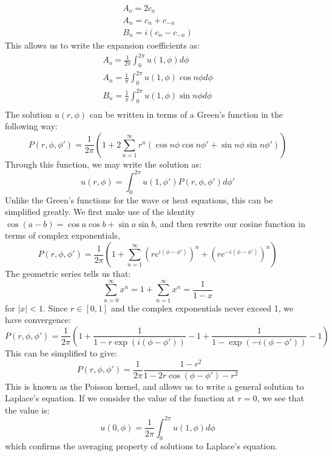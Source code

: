 \documentclass{article}
\begin{document}
\begin{appendices}
\begin{equation}
  \begin{matrix}
    A_o = 2 c_o\\
    A_n = c_n + c_{-n}\\
    B_n = i(c_n - c_{-n})
  \end{matrix}
\end{equation}
This allows us to write the expansion coefficients as:
\begin{equation}
  \begin{matrix}
    A_o = \frac{1}{2\pi}\int_0^{2\pi} u(1,\phi)d\phi\\
    A_n = \frac{1}{\pi}\int_0^{2\pi} u(1,\phi)\cos n\phi d\phi\\
    B_n = \frac{1}{\pi}\int_0^{2\pi} u(1,\phi)\sin n\phi d\phi\\
  \end{matrix}
\end{equation}
The solution $u(r,\phi)$ can be written in terms of a Green's function in the following way:
\begin{equation}P(r,\phi,\phi') = \frac{1}{2\pi}\left(1+ 2\sum_{n=1}^\infty r^n (\cos n\phi\cos n\phi'+\sin n\phi\sin n\phi') \right)
\end{equation}
Through this function, we may write the solution as:
\begin{equation}
  u(r,\phi) = \int_0^{2\pi} u(1,\phi')P(r,\phi,\phi')d\phi'
\end{equation}
Unlike the Green's functions for the wave or heat equations, this can be simplified greatly. We first make use of the identity $\cos(a-b)=\cos a\cos b+\sin a\sin b$, and then rewrite our cosine function in terms of complex exponentials,
\begin{equation}
  P(r,\phi,\phi') = \frac{1}{2\pi}\left(
    1+\sum_{n = 1}^{\infty } (re^{i(\phi-\phi')})^n + (re^{-i(\phi-\phi')})^n 
  \right)
\end{equation}
The geometric series tells us that:
\begin{equation}
  \sum_{n=0}^\infty x^n = 1+\sum_{n=1}^\infty x^n = \frac{1}{1-x}
\end{equation}
for $|x|<1$. Since $r\in [0,1]$ and the complex exponentials never exceed 1, we have convergence:
\begin{equation}
  P(r,\phi,\phi') = \frac{1}{2\pi}\left(1+\frac{1}{1-r \exp(i(\phi-\phi'))}-1 + \frac{1}{1-\exp(-i(\phi-\phi'))} - 1\right)
\end{equation}
This can be simplified to give:
\begin{equation}
  \boxed{
    P(r,\phi,\phi') = \frac{1}{2\pi} \frac{1-r^2}{1 - 2r \cos(\phi-\phi') - r^2}
  }
\end{equation}
This is known as the Poisson kernel, and allows us to write a general solution to Laplace's equation. If we consider the value of the function at $r=0$, we see that the value is:
\begin{equation}
  u(0,\phi) = \frac{1}{2\pi}\int_0^{2\pi} u(1,\phi)d\phi
\end{equation}
which confirms the averaging property of solutions to Laplace's equation.

\end{appendices}
\end{document}
